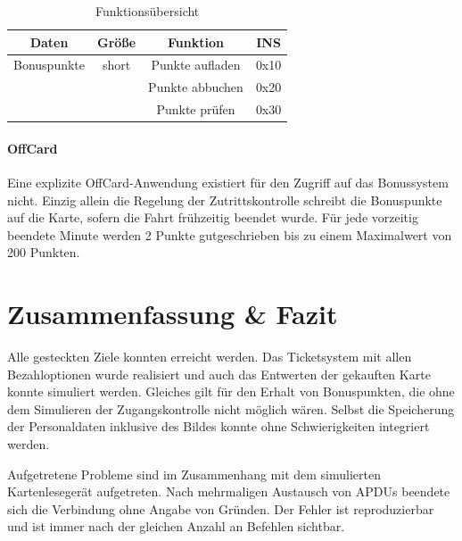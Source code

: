 \documentclass[	a4paper,
			11pt,
			oneside,
			parskip]{scrartcl}
\begin{document}
\begin{table}[H]
  \centering
  \caption{Funktionsübersicht}
    \begin{tabular}{crcc}
    \toprule
    \textbf{Daten} & \multicolumn{1}{c}{\textbf{Größe}} & \textbf{Funktion} & \textbf{INS} \\
    \midrule
    Bonuspunkte & \multicolumn{1}{c}{short} & Punkte aufladen & 0x10 \\
          & \multicolumn{1}{c}{} & Punkte abbuchen & 0x20 \\
          & \multicolumn{1}{c}{} & Punkte prüfen & 0x30 \\
    \bottomrule
    \end{tabular}%
  \label{tab:bonusdata}%
\end{table}%

\paragraph{OffCard} Eine explizite OffCard-Anwendung existiert für den Zugriff auf das Bonussystem nicht. Einzig allein die Regelung der Zutrittskontrolle schreibt die Bonuspunkte auf die Karte, sofern die Fahrt frühzeitig beendet wurde. Für jede vorzeitig beendete Minute werden 2 Punkte gutgeschrieben bis zu einem Maximalwert von 200 Punkten.
	
\section{Zusammenfassung \& Fazit}

Alle gesteckten Ziele konnten erreicht werden. Das Ticketsystem mit allen Bezahloptionen wurde realisiert und auch das Entwerten der gekauften Karte konnte simuliert werden. Gleiches gilt für den Erhalt von Bonuspunkten, die ohne dem Simulieren der Zugangskontrolle nicht möglich wären. Selbst die Speicherung der Personaldaten inklusive des Bildes konnte ohne Schwierigkeiten integriert werden.\medskip

Aufgetretene Probleme sind im Zusammenhang mit dem simulierten Kartenlesegerät aufgetreten. Nach mehrmaligen Austausch von APDUs beendete sich die Verbindung ohne Angabe von Gründen. Der Fehler ist reproduzierbar und ist immer nach der gleichen Anzahl an Befehlen sichtbar. 
\end{document}
